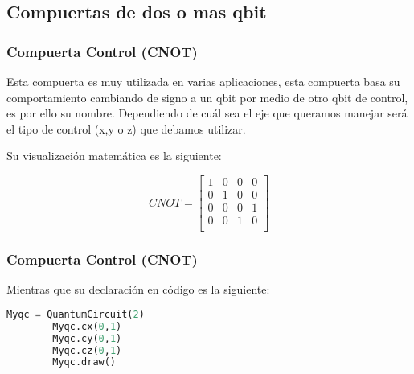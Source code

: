 \documentclass[spanish]{beamer}
\begin{document}
    \newpage\subsection{Compuertas de dos o mas qbit}
    \begin{frame}[fragile]
    \frametitle{Compuerta Control (CNOT)}
     Esta compuerta es muy utilizada en varias aplicaciones, esta compuerta basa su comportamiento cambiando de signo a un qbit por medio de otro qbit de control, es por ello su nombre. Dependiendo de cuál sea el eje que queramos manejar será el tipo de control (x,y o z) que debamos utilizar.
     
    Su visualización matemática es la siguiente:
     
      \begin{equation}
        CNOT =\begin{bmatrix}
            1 & 0 & 0 & 0\\
            0 & 1 & 0 & 0\\
            0 & 0 & 0 & 1\\
            0 & 0 & 1 & 0\\
        \end{bmatrix}
        \end{equation}
        \end{frame} 
     \newpage\begin{frame}[fragile]
     \frametitle{Compuerta Control (CNOT)}
     Mientras que su declaración en código es la siguiente:
     
      \begin{lstlisting}[language=Python]
        Myqc = QuantumCircuit(2)
        Myqc.cx(0,1)
        Myqc.cy(0,1)
        Myqc.cz(0,1)
        Myqc.draw() \end{lstlisting}
    \end{frame}  
\end{document}
